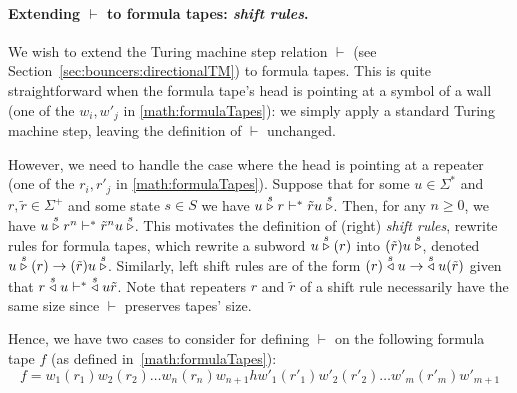 



\paragraph*{Extending $\vdash$ to formula tapes: \textit{shift rules}.} We wish to extend the Turing machine step relation $\vdash$ (see Section~\ref{sec:bouncers:directionalTM}) to formula tapes. This is quite straightforward when the formula tape's head is pointing at a symbol of a wall (one of the $w_i, w'_j$ in \eqref{math:formulaTapes}): we simply apply a standard Turing machine step, leaving the definition of $\vdash$ unchanged.

However, we need to handle the case where the head is pointing at a repeater (one of the $r_i, r'_j$ in \eqref{math:formulaTapes}). Suppose that for some $u\in\Sigma^*$ and $r,\tilde{r}\in\Sigma^+$ and some state $s\in S$ we have $u \stackrel{s}\triangleright r \vdash^* \tilde{r} u \stackrel{s}\triangleright$. Then, for any $n\geq 0$, we have $u \stackrel{s}\triangleright r^n \vdash^* \tilde{r}^n u \stackrel{s}\triangleright$. This motivates the definition of
(right) \textit{shift rules}, rewrite rules for formula tapes, which rewrite a subword $u \stackrel{s}\triangleright(r)$ into $(\tilde{r})u\stackrel{s}\triangleright$, denoted $u \stackrel{s}\triangleright(r) \to (\tilde{r})u\stackrel{s}\triangleright$. Similarly, left shift rules are of the form $(r)\stackrel{s}\triangleleft u \to \;\stackrel{s}\triangleleft u(\tilde{r})$ given that $r\stackrel{s}\triangleleft u \vdash^* \;\stackrel{s}\triangleleft u\tilde{r}$. Note that repeaters $r$ and $\tilde{r}$ of a shift rule necessarily have the same size since $\vdash$ preserves tapes' size.

Hence, we have two cases to consider for defining $\vdash$ on the following formula tape $f$ (as defined in~\eqref{math:formulaTapes}):
$$f = w_1(r_1)w_2(r_2)\dots w_n(r_n) w_{n+1} h w'_1(r'_1)w'_2(r'_2)\dots w'_m(r'_m) w'_{m+1}$$


